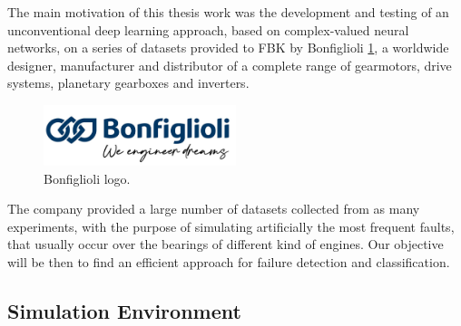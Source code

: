 \documentclass[../main.tex]{subfiles}
\begin{document}
The main motivation of this thesis work was the development and testing of an unconventional deep learning approach, based on complex-valued neural networks, on a series of datasets provided to FBK by Bonfiglioli \ref{fig:bonfiglioli_logo}, a worldwide designer, manufacturer and distributor of a complete range of gearmotors, drive systems, planetary gearboxes and inverters.\\
\begin{figure}
	\includegraphics[width=0.5\textwidth]{pictures/bonfiglioli_logo.pdf}
	\caption{Bonfiglioli logo.}
	\label{fig:bonfiglioli_logo}
\end{figure}
The company provided a large number of datasets collected from as many experiments, with the purpose of simulating artificially the most frequent faults, that usually occur over the bearings of different kind of engines. Our objective will be then to find an efficient approach for failure detection and classification.

\subsection{Simulation Environment}
\end{document}
